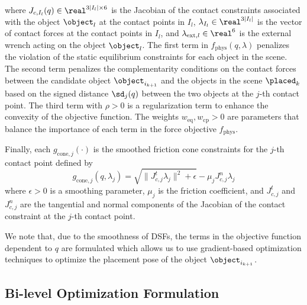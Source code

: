 where $J_{c,I_l}(q) \in \real^{3|I_l| \times 6}$ is the Jacobian of the contact constraints associated with the object $\object_l$ at the contact points in $I_l$, $\lambda_{I_l} \in \real^{3|I_l|}$ is the vector of contact forces at the contact points in $I_l$, and $\lambda_{\text{ext},l} \in \real^6$ is the external wrench acting on the object $\object_l$.
The first term in $f_\text{phys}(q,\lambda)$ penalizes the violation of the static equilibrium constraints for each object in the scene.
The second term penalizes the complementarity conditions on the contact forces between the candidate object $\object_{i_{k+1}}$ and the objects in the scene $\placed_k$ based on the signed distance $\sd_j(q)$ between the two objects at the $j$-th contact point.
The third term with $\rho > 0$ is a regularization term to enhance the convexity of the objective function.
The weights $w_\text{eq}, w_\text{cp} > 0$ are parameters that balance the importance of each term in the force objective $f_\text{phys}$.

Finally, each $g_{\text{cone},j}(\cdot)$ is the smoothed friction cone constraints for the $j$-th contact point defined by
\begin{equation}
    g_{\text{cone},j}(q, \lambda_j) = \sqrt{\|J_{c,j}^t \lambda_j \|^2 + \epsilon} - \mu_j  J_{c,j}^n \lambda_j
    \label{eq:friction_cone}
\end{equation}
where $\epsilon > 0$ is a smoothing parameter, $\mu_j$ is the friction coefficient, and $J_{c,j}^t$ and $J_{c,j}^n$ are the tangential and normal components of the Jacobian of the contact constraint at the $j$-th contact point.

We note that, due to the smoothness of DSFs, the terms in the objective function dependent to $q$ are formulated which allows us to use gradient-based optimization techniques to optimize the placement pose of the object $\object_{i_{k+1}}$.


\subsection{Bi-level Optimization Formulation}

